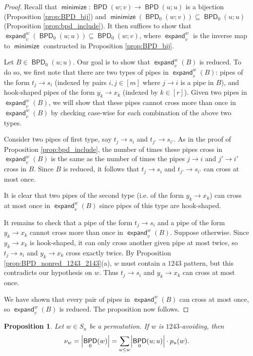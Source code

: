 \documentclass[11pt]{article}
\newtheorem{proposition}[theo]{Proposition}
\theoremstyle{definition}
\numberwithin{equation}{section}
\newcommand{\sseq}{\subseteq}
\DeclarePairedDelimiter\abs{\lvert}{\rvert}
\DeclareMathOperator{\minimize}{\mathsf{minimize}}
\DeclareMathOperator{\expand}{\mathsf{expand}}
\DeclareMathOperator{\BPD}{\mathsf{BPD}}
\begin{document}
\begin{proof}
    Recall that $\minimize\colon \BPD(w;v)\to \BPD(u;u)$ is a bijection (Proposition \ref{prop:BPD_bij}) and $\minimize(\BPD_0(w;v)) \sseq \BPD_0(u;u)$ (Proposition \ref{prop:bpd_include}).
    It then suffices to show that $\expand_v^w(\BPD_0(u;u)) \sseq \BPD_0(w;v)$, where $\expand_v^w$ is the inverse map to $\minimize$ constructed in Proposition \ref{prop:BPD_bij}.
    
    Let $B\in \BPD_0(u;u)$.
    Our goal is to show that $\expand_v^w(B)$ is reduced.
    To do so, we first note that there are two types of pipes in $\expand_v^w(B)$:
    pipes of the form $t_j\to s_i$ (indexed by pairs $i,j\in [m]$ where $j\to i$ is a pipe in $B$),
    and hook-shaped pipes of the form $y_k\to x_k$ (indexed by $k\in [r]$).
    Given two pipes in $\expand_v^w(B)$, we will show that these pipes cannot cross more than once in $\expand_v^w(B)$ by checking case-wise for each combination of the above two types.
    
    Consider two pipes of first type, say $t_j\to s_i$ and $t_{j'}\to s_{i'}$.
    As in the proof of Proposition \ref{prop:bpd_include},
    the number of times these pipes cross in $\expand_v^w(B)$ is the same as the number of times the pipes $j\to i$ and $j'\to i'$ cross in $B$.
    Since $B$ is reduced, it follows that $t_j\to s_i$ and $t_{j'}\to s_{i'}$ can cross at most once.
    
    It is clear that two pipes of the second type (i.e. of the form $y_k\to x_k$) can cross at most once in $\expand_v^w(B)$ since pipes of this type are hook-shaped.
    
    It remains to check that a pipe of the form $t_j\to s_i$ and a pipe of the form $y_k\to x_k$ cannot cross more than once in $\expand_v^w(B)$.
    Suppose otherwise.
    Since $y_k\to x_k$ is hook-shaped, it can only cross another given pipe at most twice, so $t_j\to s_i$ and $y_k\to x_k$ cross exactly twice.
    By Proposition \ref{prop:BPD_nonred_1243_2143}(a), $w$ must contain a $1243$ pattern, but this contradicts our hypothesis on $w$.
    Thus $t_j\to s_i$ and $y_k\to x_k$ can cross at most once.
    
    We have shown that every pair of pipes in $\expand_v^w(B)$ can cross at most once, so $\expand_v^w(B)$ is reduced.
    The proposition now follows.
\end{proof}

\begin{proposition}
\label{prop:schub_1243}
    Let $w\in S_n$ be a permutation.
    If $w$ is $1243$-avoiding,
    then \[
        \nu_w = \abs*{\BPD_0(w)}
        = \sum_{u\leq w} \abs*{\BPD_0(u;u)}\cdot p_u(w).
    \]
\end{proposition}
\end{document}
